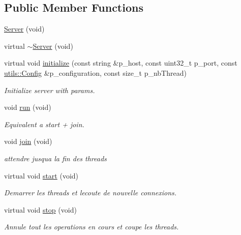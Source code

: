 \subsection*{Public Member Functions}
\begin{DoxyCompactItemize}
\item 
\hyperlink{classxtd_1_1network_1_1base_1_1Server_a3f29ba7011873a7048d944087279fd21}{Server} (void)
\item 
virtual \hyperlink{classxtd_1_1network_1_1base_1_1Server_ab17ca2e2332664f4cb83e89d027976d9}{$\sim$\+Server} (void)
\item 
virtual void \hyperlink{classxtd_1_1network_1_1base_1_1Server_a97d54b5ded7a8b02333347a5ffbbd347}{initialize} (const string \&p\+\_\+host, const uint32\+\_\+t p\+\_\+port, const \hyperlink{classxtd_1_1network_1_1utils_1_1Config}{utils\+::\+Config} \&p\+\_\+configuration, const size\+\_\+t p\+\_\+nb\+Thread)
\begin{DoxyCompactList}\small\item\em Initialize server with params. \end{DoxyCompactList}\item 
void \hyperlink{classxtd_1_1network_1_1base_1_1Server_a30e423831ba183c16425422f07f207c5}{run} (void)
\begin{DoxyCompactList}\small\item\em Equivalent a start + join. \end{DoxyCompactList}\item 
void \hyperlink{classxtd_1_1network_1_1base_1_1Server_aabee855541e60adeb2115856d123637b}{join} (void)
\begin{DoxyCompactList}\small\item\em attendre jusqu\textquotesingle{}a la fin des threads \end{DoxyCompactList}\item 
virtual void \hyperlink{classxtd_1_1network_1_1base_1_1Server_ae9d5a1070819996c244003adc92a35ee}{start} (void)
\begin{DoxyCompactList}\small\item\em Demarrer les threads et l\textquotesingle{}ecoute de nouvelle connexions. \end{DoxyCompactList}\item 
virtual void \hyperlink{classxtd_1_1network_1_1base_1_1Server_a0746f85458e7eff28cfe6e156ad99402}{stop} (void)
\begin{DoxyCompactList}\small\item\em Annule tout les operations en cours et coupe les threads. \end{DoxyCompactList}\end{DoxyCompactItemize}

